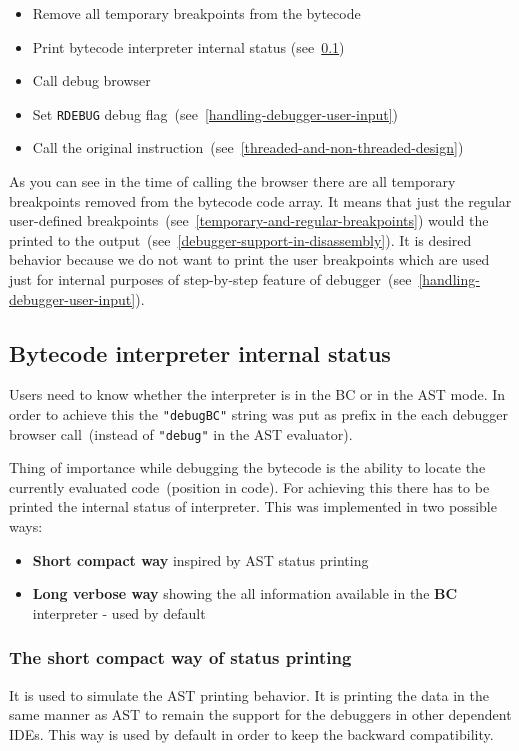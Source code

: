 \documentclass[thesis=M,english]{FITthesis}[2018/10/20]
\newcommand{\code}[1]{\texttt{#1}}
\begin{document}
\begin{itemize}
	\item Remove all temporary breakpoints from the bytecode
	\item Print bytecode interpreter internal status (see~\ref{bytecode-interpreter-internal-status})
	\item Call debug browser
	\item Set \code{RDEBUG} debug flag~(see~\ref{handling-debugger-user-input})
	\item Call the original instruction~(see~\ref{threaded-and-non-threaded-design})
\end{itemize}

As you can see in the time of calling the browser there are all temporary breakpoints removed from the bytecode code array. It means that just the regular user-defined breakpoints~(see~\ref{temporary-and-regular-breakpoints}) would the printed to the output~(see~\ref{debugger-support-in-disassembly}). It is desired behavior because we do not want to print the user breakpoints which are used just for internal purposes of step-by-step feature of debugger~(see~\ref{handling-debugger-user-input}).

\subsection{Bytecode interpreter internal status}\label{bytecode-interpreter-internal-status}

Users need to know whether the interpreter is in the BC or in the AST mode. In order to achieve this the \code{"debugBC"} string was put as prefix in the each debugger browser call~(instead of \code{"debug"} in the AST evaluator).

Thing of importance while debugging the bytecode is the ability to locate the currently evaluated code~(position in code). For achieving this there has to be printed the internal status of interpreter. This was implemented in two possible ways:

\begin{itemize}
	\item \textbf{Short compact way} inspired by AST status printing
	\item \textbf{Long verbose way} showing the all information available in the \textbf{BC} interpreter - used by default
\end{itemize}

\subsubsection{The short compact way of status printing}\label{short-compact-way-of-status-printing}
It is used to simulate the AST printing behavior. It is printing the data in the same manner as AST to remain the support for the debuggers in other dependent IDEs. This way is used by default in order to keep the backward compatibility.
\end{document}
